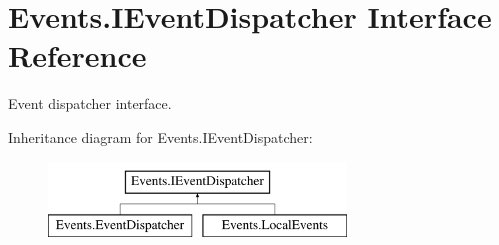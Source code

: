 \hypertarget{interface_events_1_1_i_event_dispatcher}{}\section{Events.\+I\+Event\+Dispatcher Interface Reference}
\label{interface_events_1_1_i_event_dispatcher}


Event dispatcher interface.  


Inheritance diagram for Events.\+I\+Event\+Dispatcher\+:\begin{figure}[H]
\begin{center}
\leavevmode
\includegraphics[height=2.000000cm]{interface_events_1_1_i_event_dispatcher}
\end{center}
\end{figure}
